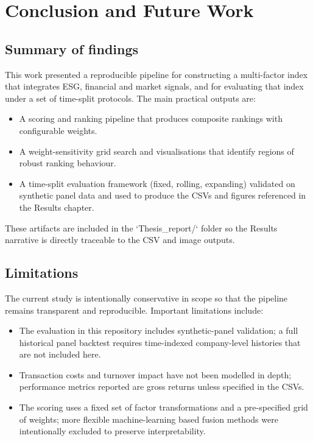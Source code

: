 

\chapter{Conclusion and Future Work} %

\label{Chapter6} %


\section{Summary of findings}

This work presented a reproducible pipeline for constructing a multi-factor index that integrates ESG, financial and market signals, and for evaluating that index under a set of time-split protocols. The main practical outputs are:

\begin{itemize}
	\item A scoring and ranking pipeline that produces composite rankings with configurable weights.
	\item A weight-sensitivity grid search and visualisations that identify regions of robust ranking behaviour.
	\item A time-split evaluation framework (fixed, rolling, expanding) validated on synthetic panel data and used to produce the CSVs and figures referenced in the Results chapter.
\end{itemize}

These artifacts are included in the `Thesis_report/` folder so the Results narrative is directly traceable to the CSV and image outputs.


\section{Limitations}

The current study is intentionally conservative in scope so that the pipeline remains transparent and reproducible. Important limitations include:

\begin{itemize}
	\item The evaluation in this repository includes synthetic-panel validation; a full historical panel backtest requires time-indexed company-level histories that are not included here.
	\item Transaction costs and turnover impact have not been modelled in depth; performance metrics reported are gross returns unless specified in the CSVs.
	\item The scoring uses a fixed set of factor transformations and a pre-specified grid of weights; more flexible machine-learning based fusion methods were intentionally excluded to preserve interpretability.
\end{itemize}

